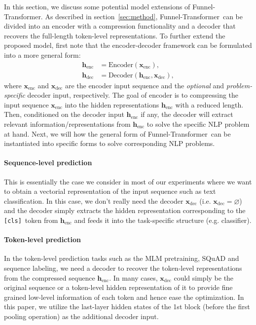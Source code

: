 \documentclass{article}
\theoremstyle{custom}
\def\rvh{{\mathbf{h}}}
\def\rvx{{\mathbf{x}}}
\newcommand{\cls}{\texttt{[cls]}~}
\newcommand{\name}{Funnel-Transformer~}
\begin{document}
In this section, we discuss some potential model extensions of Funnel-Transformer.
As described in section~\ref{sec:method}, \name can be divided into an encoder with a compression functionality and a decoder that recovers the full-length token-level representations.
To further extend the proposed model, first note that the encoder-decoder framework can be formulated into a more general form:
\begin{align*}
\rvh_\text{enc} &= \text{Encoder}(\rvx_\text{enc}), \\
\rvh_\text{dec} &= \text{Decoder}(\rvh_\text{enc}, \rvx_\text{dec}),
\end{align*}
where $\rvx_\text{enc}$ and $\rvx_\text{dec}$ are the encoder input sequence and the \textit{optional} and \textit{problem-specific} decoder input, respectively.
The goal of encoder is to compressing the input sequence $\rvx_\text{enc}$ into the hidden representations $\rvh_\text{enc}$ with a reduced length.
Then, conditioned on the decoder input $\rvh_\text{enc}$ if any, the decoder will extract relevant information/representations from $\rvh_\text{enc}$ to solve the specific NLP problem at hand.
Next, we will how the general form of \name can be instantiated into specific forms to solve corresponding NLP problems.

\paragraph{Sequence-level prediction} This is essentially the case we consider in most of our experiments where we want to obtain a vectorial representation of the input sequence such as text classification.
In this case, we don't really need the decoder $\rvx_\text{dec}$ (i.e. $\rvx_\text{dec} = \varnothing$) and the decoder simply extracts the hidden representation corresponding to the \cls token from $\rvh_\text{enc}$ and feeds it into the task-specific structure (e.g. classifier).

\paragraph{Token-level prediction} In the token-level prediction tasks such as the MLM pretraining, SQuAD and sequence labeling, we need a decoder to recover the token-level representations from the compressed sequence $\rvh_\text{enc}$.
In many cases, $\rvx_\text{dec}$ could simply be the original sequence or a token-level hidden representation of it to provide fine grained low-level information of each token and hence ease the optimization.
In this paper, we utilize the last-layer hidden states of the 1st block (before the first pooling operation) as the additional decoder input.
\end{document}
